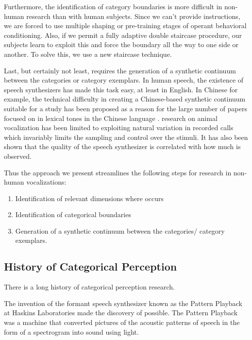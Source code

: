 Furthermore, the identification of category boundaries is more difficult in non-human research than with human subjects. Since we can't provide instructions, we are forced to use multiple shaping or pre-training stages of operant behavioral conditioning. Also, if we permit a fully adaptive double staircase procedure, our subjects learn to exploit this and force the boundary all the way to one side or another. To solve this, we use a new staircase technique.

Last, but certainly not least, \CP requires the generation of a synthetic continuum between the categories or category exemplars. In human speech, the existence of speech synthesizers has made this task easy, at least in English. In Chinese for example, the technical difficulty in creating a Chinese-based synthetic continuum suitable for a \CP study has been proposed as a reason for the large number of papers focused on \CP in lexical tones in the Chinese language \cite{zhang2013categorical}. \CP research on animal vocalization has been limited to exploiting natural variation in recorded calls \cite{swamp sparrow cp} which invariably limits the sampling and control over the stimuli. It has also been shown that the quality of the speech synthesizer is correlated with how much \CP is observed\cite{van1999categorical}.

Thus the approach we present streamlines the following steps for \CP research in non-human vocalizations:
\begin{enumerate}
    \item Identification of relevant dimensions where \CP occurs
    \item Identification of categorical boundaries
    \item Generation of a synthetic continuum between the categories/ category exemplars.
\end{enumerate}

\subsection{History of Categorical Perception}

There is a long history of categorical perception research.

The invention of the formant speech synthesizer known as the Pattern Playback at Haskins Laboratories \cite{patternplayback} made the discovery of \CP possible.
The Pattern Playback was a machine that converted pictures of the acoustic patterns of speech in the form of a spectrogram into sound using light.

